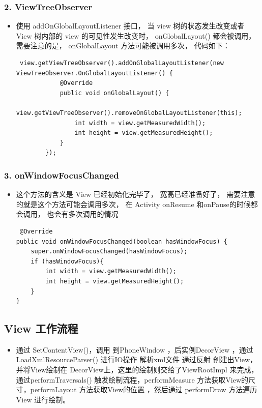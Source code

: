 \documentclass[9pt, b5paper]{article}
\begin{document}
\subsubsection{2. ViewTreeObserver}
\label{sec-1-7-2}
\begin{itemize}
\item 使用 addOnGlobalLayoutListener 接口， 当 view 树的状态发生改变或者 View 树内部的 view 的可见性发生改变时， onGlobalLayout() 都会被调用， 需要注意的是， onGlobalLayout 方法可能被调用多次， 代码如下：
\begin{verbatim}
 view.getViewTreeObserver().addOnGlobalLayoutListener(new ViewTreeObserver.OnGlobalLayoutListener() {
            @Override
            public void onGlobalLayout() {
                view.getViewTreeObserver().removeOnGlobalLayoutListener(this);
                int width = view.getMeasuredWidth();
                int height = view.getMeasuredHeight();
            }
        });
\end{verbatim}
\end{itemize}
\subsubsection{3. onWindowFocusChanged}
\label{sec-1-7-3}
\begin{itemize}
\item 这个方法的含义是 View 已经初始化完毕了， 宽高已经准备好了， 需要注意的就是这个方法可能会调用多次， 在 Activity onResume 和onPause的时候都会调用， 也会有多次调用的情况
\begin{verbatim}
 @Override
public void onWindowFocusChanged(boolean hasWindowFocus) {
    super.onWindowFocusChanged(hasWindowFocus);
    if (hasWindowFocus){
        int width = view.getMeasuredWidth();
        int height = view.getMeasuredHeight();
    }
}
\end{verbatim}
\end{itemize}


\subsection{View 工作流程}
\label{sec-1-8}
\begin{itemize}
\item 通过 SetContentView()，调用 到PhoneWindow ，后实例DecorView ，通过 LoadXmlResourceParser() 进行IO操作 解析xml文件 通过反射 创建出View，并将View绘制在 DecorView上，这里的绘制则交给了ViewRootImpl 来完成，通过performTraversals() 触发绘制流程，performMeasure 方法获取View的尺寸，performLayout 方法获取View的位置 ，然后通过 performDraw 方法遍历View 进行绘制。
\end{itemize}
\end{document}
